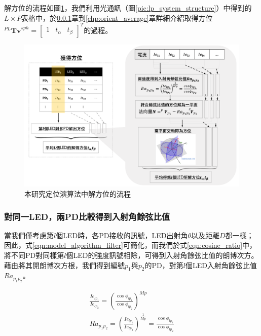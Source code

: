     解方位的流程如圖\ref{pic:orient_flow}，我們利用光通訊（圖\ref{pic:lp_system_structure}）中得到的$L\times P$表格中，於\ref{chp:cosine_ratio}章到\ref{chp:orient_average}章詳細介紹取得方位$^{PL}\boldsymbol{Tv}^{sph} = \left[\begin{array}{ccc}1&t_{\alpha}&t_{\beta}\end{array}\right]^T$的過程。

    \begin{figure}[h]
        \centering
        \includegraphics[width=14cm]{ch3pic/orient_flow.png}
        \caption{本研究定位演算法中解方位的流程}
        \label{pic:orient_flow}
    \end{figure}

    \subsubsection{對同一LED，兩PD比較得到入射角餘弦比值}
    \label{chp:cosine_ratio}
    
        當我們僅考慮第$l$個LED時，各PD接收的訊號，LED出射角$\theta$以及距離$D$都一樣；因此，式\ref{eqn:model_algorithm_filter}可簡化，而我們於式\ref{eqn:cosine_ratio}中，將不同PD對同樣第$l$個LED的強度訊號相除，可得到入射角餘弦比值的朗博次方。藉由將其開朗博次方根，我們得到編號$p_1$與$p_2$的PD，對第$l$個LED入射角餘弦比值$Ra_{p_1p_2}$。
    
        \begin{equation}
            \label{eqn:cosine_ratio}
            \begin{aligned}
                \frac{Ie_{lp_1}}{Ie_{lp_2}}={(\frac{\cos\phi_{lp_1}} {\cos\phi_{lp_2}})}^{Mp}\\
                Ra_{p_1p_2} = {( \frac{Ie_{lp_1}}{Ie_{lp_2}})} ^{\frac{1}{Mp}} = \frac{\cos\phi_{lp_1}}{\cos\phi_{lp_2}}
            \end{aligned}
        \end{equation}

